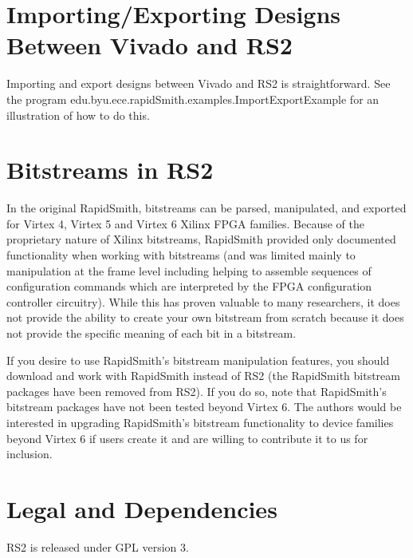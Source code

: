\documentclass[12pt]{article}
\begin{document}
\section{Importing/Exporting Designs Between Vivado and RS2}

Importing and export designs between Vivado and RS2 is straightforward.  See the
program edu.byu.ece.rapidSmith.examples.ImportExportExample for an illustration
of how to do this.

\section{Bitstreams in RS2}

In the original RapidSmith, bitstreams can be parsed, manipulated, and exported
for Virtex 4, Virtex 5 and Virtex 6 Xilinx FPGA families.  Because of the
proprietary nature of Xilinx bitstreams, RapidSmith provided only documented
functionality when working with bitstreams (and was limited mainly to
manipulation at the frame level including helping to assemble sequences of
configuration commands which are interpreted by the FPGA configuration
controller circuitry).  While this has proven valuable to many researchers, it
does not provide the ability to create your own bitstream from scratch because
it does not provide the specific meaning of each bit in a bitstream.

If you desire to use RapidSmith's bitstream manipulation features, you should
download and work with RapidSmith instead of RS2 (the RapidSmith bitstream
packages have been removed from RS2).  If you do so, note that RapidSmith's
bitstream packages have not been tested beyond Virtex 6.  The authors would be
interested in upgrading RapidSmith's bitstream functionality to device families
beyond Virtex 6 if users create it and are willing to contribute it to us for
inclusion.

\section{Legal and Dependencies}
RS2 is released under GPL version 3.
\end{document}
